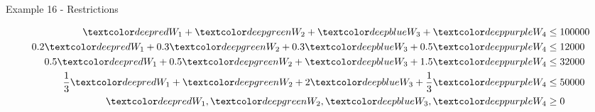 \begin{frame}{Example 16 - Restrictions}

\begin{align*}
       \colora{W_1} +    \colorb{W_2} +    \colorc{W_3} +    \colord{W_4} &\le 100000 \\
    0.2\colora{W_1} + 0.3\colorb{W_2} + 0.3\colorc{W_3} + 0.5\colord{W_4} &\le 12000 \\
    0.5\colora{W_1} + 0.5\colorb{W_2} +    \colorc{W_3} + 1.5\colord{W_4} &\le 32000 \\
    \frac{1}{3}\colora{W_1} + \colorb{W_2} + 2\colorc{W_3} + \frac{1}{3}\colord{W_4} &\le 50000 \\
    \colora{W_1}, \colorb{W_2}, \colorc{W_3}, \colord{W_4} &\ge 0
\end{align*}

\end{frame}
